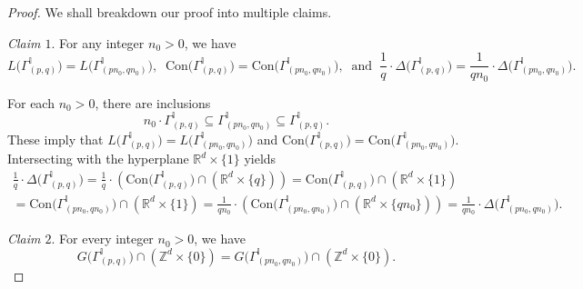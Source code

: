 \documentclass[10pt,a4paper]{amsart}
\begin{document}
\begin{proof} We shall breakdown our proof into multiple claims.

\vspace{0.2cm}
\noindent
\emph{Claim $1$}. For any integer $n_0>0$, we have
\begin{equation*}
L\big(\Gamma^{\mathbb{I}}_{(p,q)}\big) = L\big(\Gamma^{\mathbb{I}}_{(pn_0,qn_0)}\big),\;\; \mathrm{Con}\big(\Gamma^{\mathbb{I}}_{(p,q)}\big) = \mathrm{Con}\big(\Gamma^{\mathbb{I}}_{(pn_0,qn_0)}\big), \;\; \text{and} \;\; \frac{1}{q}\cdot\Delta\big(\Gamma^{\mathbb{I}}_{(p,q)}\big) = \frac{1}{qn_0}\cdot\Delta\big(\Gamma^{\mathbb{I}}_{(pn_0,qn_0)}\big).
\end{equation*}

For each $n_0>0$, there are inclusions $$n_0 \cdot \Gamma^{\mathbb{I}}_{(p,q)} \subseteq \Gamma^{\mathbb{I}}_{(pn_0,qn_0)} \subseteq \Gamma^{\mathbb{I}}_{(p,q)}.$$ These imply that $L\big(\Gamma^{\mathbb{I}}_{(p,q)}\big) = L\big(\Gamma^{\mathbb{I}}_{(pn_0,qn_0)}\big)$ and $\mathrm{Con}\big(\Gamma^{\mathbb{I}}_{(p,q)}\big) = \mathrm{Con}\big(\Gamma^{\mathbb{I}}_{(pn_0,qn_0)}\big)$. Intersecting with the hyperplane $\mathbb{R}^d\times \{1\}$ yields
\begin{multline*}
 \frac{1}{q}\cdot\Delta\big(\Gamma^{\mathbb{I}}_{(p,q)}\big) = \frac{1}{q}\cdot\left(\mathrm{Con}\big(\Gamma^{\mathbb{I}}_{(p,q)}\big) \cap \left(\mathbb{R}^d\times \{q\}\right)\right) = \mathrm{Con}\big(\Gamma^{\mathbb{I}}_{(p,q)}\big) \cap \left(\mathbb{R}^d\times \{1\}\right)\\ =\mathrm{Con}\big(\Gamma^{\mathbb{I}}_{(pn_0,qn_0)}\big) \cap \left(\mathbb{R}^d\times \{1\}\right) = \frac{1}{qn_0}\cdot\left(\mathrm{Con}\big(\Gamma^{\mathbb{I}}_{(pn_0,qn_0)}\big) \cap \left(\mathbb{R}^d\times \{qn_0\}\right)\right) = \frac{1}{qn_0}\cdot\Delta\big(\Gamma^{\mathbb{I}}_{(pn_0,qn_0)}\big).
\end{multline*}

\vspace{0.2cm}
\noindent
\emph{Claim $2$}. For every integer $n_0>0$, we have
\begin{equation*}
G\big(\Gamma^{\mathbb{I}}_{(p,q)}\big) \cap \left(\mathbb{Z}^d\times \{0\}\right) = G\big(\Gamma^{\mathbb{I}}_{(pn_0,qn_0)}\big) \cap \left(\mathbb{Z}^d\times \{0\}\right).
\end{equation*}


\end{proof}
\end{document}
